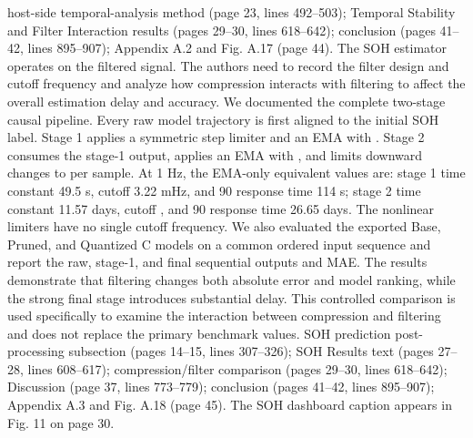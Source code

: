 {} host-side temporal-analysis method (page 23, lines 492--503); Temporal Stability and Filter Interaction results (pages 29--30, lines 618--642); conclusion (pages 41--42, lines 895--907); Appendix A.2 and Fig. A.17 (page 44).\markdownRendererInterblockSeparator
{}
\markdownRendererSectionEnd \markdownRendererSectionBegin
{}\markdownRendererInterblockSeparator
{}\markdownRendererBlockQuoteBegin
The SOH estimator operates on the filtered signal. The authors need to record the filter design and cutoff frequency and analyze how compression interacts with filtering to affect the overall estimation delay and accuracy.\markdownRendererBlockQuoteEnd \markdownRendererInterblockSeparator
{} We documented the complete two-stage causal pipeline. Every raw model trajectory is first aligned to the initial SOH label. Stage 1 applies a symmetric step limiter and an EMA with . Stage 2 consumes the stage-1 output, applies an EMA with , and limits downward changes to  per sample. At 1 Hz, the EMA-only equivalent values are: stage 1 time constant 49.5 s, cutoff 3.22 mHz, and 90\markdownRendererPercentSign{} response time 114 s; stage 2 time constant 11.57 days, cutoff , and 90\markdownRendererPercentSign{} response time 26.65 days. The nonlinear limiters have no single cutoff frequency.\markdownRendererParagraphSeparator
{}We also evaluated the exported Base, Pruned, and Quantized C models on a common ordered input sequence and report the raw, stage-1, and final sequential outputs and MAE. The results demonstrate that filtering changes both absolute error and model ranking, while the strong final stage introduces substantial delay. This controlled comparison is used specifically to examine the interaction between compression and filtering and does not replace the primary benchmark values.\markdownRendererParagraphSeparator
{} SOH prediction post-processing subsection (pages 14--15, lines 307--326); SOH Results text (pages 27--28, lines 608--617); compression/filter comparison (pages 29--30, lines 618--642); Discussion (page 37, lines 773--779); conclusion (pages 41--42, lines 895--907); Appendix A.3 and Fig. A.18 (page 45). The SOH dashboard caption appears in Fig. 11 on page 30.\markdownRendererInterblockSeparator
